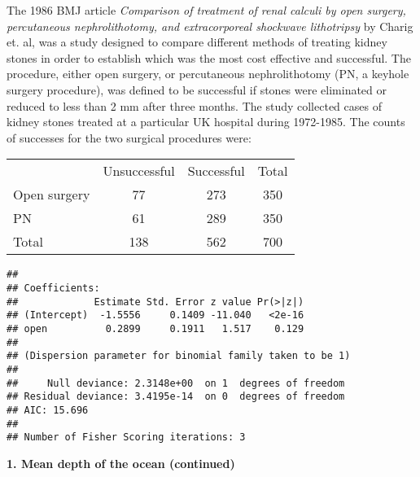 \documentclass[10pt]{beamer}\usepackage[]{graphicx}\usepackage[]{color}
\makeatletter
\newenvironment{kframe}{%
 \def\at@end@of@kframe{}%
 \ifinner\ifhmode%
  \def\at@end@of@kframe{\end{minipage}}%
  \begin{minipage}{\columnwidth}%
 \fi\fi%
 \def\FrameCommand##1{\hskip\@totalleftmargin \hskip-\fboxsep
 \colorbox{shadecolor}{##1}\hskip-\fboxsep
     \hskip-\linewidth \hskip-\@totalleftmargin \hskip\columnwidth}%
 \MakeFramed {\advance\hsize-\width
   \@totalleftmargin\z@ \linewidth\hsize
   \@setminipage}}%
 {\par\unskip\endMakeFramed%
 \at@end@of@kframe}
\newenvironment{knitrout}{}{} %
\makeatother
\begin{document}
\begin{frame}
\vspace{-.91in}
	\tiny
The 1986 BMJ article \textit{Comparison of treatment of renal calculi by open surgery, percutaneous nephrolithotomy, and extracorporeal shockwave lithotripsy} by Charig et. al, was a study designed to compare different methods of treating kidney stones in order to establish which was the most cost effective and successful. The procedure, either open surgery, or percutaneous nephrolithotomy (PN, a keyhole surgery procedure), was defined to be successful if stones were eliminated or reduced to less than 2 mm after three months. The study collected cases of kidney stones treated at a particular UK hospital during 1972-1985. The counts of successes for the two surgical procedures were:
\vspace{-.11in}
\begin{table}[h]
	\centering
	\begin{tabular}{lcc|c}
		& Unsuccessful &  Successful & Total\\
		Open surgery & 77 & 273 & 350 \\
		PN & 61 & 289 & 350 \\
		\hline
		Total & 138 & 562 & 700
	\end{tabular}
\end{table}
\vspace{-.21in}
\begin{knitrout}\tiny
{}\color{fgcolor}\begin{kframe}
\begin{verbatim}
## 
## Coefficients:
##             Estimate Std. Error z value Pr(>|z|)
## (Intercept)  -1.5556     0.1409 -11.040   <2e-16
## open          0.2899     0.1911   1.517    0.129
## 
## (Dispersion parameter for binomial family taken to be 1)
## 
##     Null deviance: 2.3148e+00  on 1  degrees of freedom
## Residual deviance: 3.4195e-14  on 0  degrees of freedom
## AIC: 15.696
## 
## Number of Fisher Scoring iterations: 3
\end{verbatim}
\end{kframe}
\end{knitrout}

\end{frame}

\begin{frame}
	\vspace*{-5.0in}
	\textbf{1. Mean depth of the ocean (continued)}
	
\end{frame}
\end{document}
